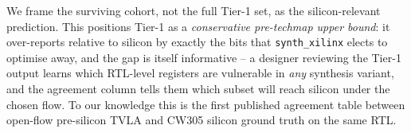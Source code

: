 We frame the surviving cohort, not the full Tier-1 set, as the silicon-relevant
prediction.  This positions Tier-1 as a \emph{conservative pre-techmap upper
bound}: it over-reports relative to silicon by exactly the bits that
\texttt{synth\_xilinx} elects to optimise away, and the gap is itself
informative -- a designer reviewing the Tier-1 output learns which RTL-level
registers are vulnerable in \emph{any} synthesis variant, and the agreement
column tells them which subset will reach silicon under the chosen flow.
To our knowledge this is the first published agreement table between
open-flow pre-silicon TVLA and CW305 silicon ground truth on the same RTL.

